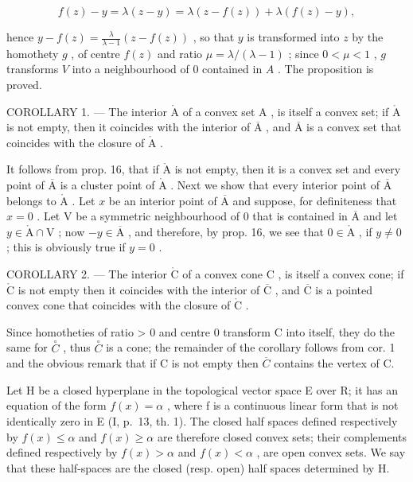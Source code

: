 \[
f (z) - y = \lambda (z - y) = \lambda (z - f (z)) + \lambda (f (z) - y),
\]

hence \(y - f(z) = \frac{\lambda}{\lambda - 1} (z - f(z))\) , so that \(y\) is transformed into \(z\) by the homothety \(g\) , of centre \(f(z)\) and ratio \(\mu = \lambda / (\lambda - 1)\) ; since \(0 < \mu < 1\) , \(g\) transforms \(V\) into a neighbourhood of 0 contained in \(A\) . The proposition is proved.

COROLLARY 1. --- The interior \(\mathring{\mathrm{A}}\) of a convex set \(\mathrm{A}\) , is itself a convex set; if \(\mathring{\mathrm{A}}\) is not empty, then it coincides with the interior of \(\overline{\mathrm{A}}\) , and \(\overline{\mathrm{A}}\) is a convex set that coincides with the closure of \(\mathring{\mathrm{A}}\) .

It follows from prop. 16, that if \(\mathring{\mathrm{A}}\) is not empty, then it is a convex set and every point of \(\overline{\mathrm{A}}\) is a cluster point of \(\mathring{\mathrm{A}}\) . Next we show that every interior point of \(\overline{\mathrm{A}}\) belongs to \(\mathring{\mathrm{A}}\) . Let \(x\) be an interior point of \(\overline{\mathrm{A}}\) and suppose, for definiteness that \(x = 0\) . Let \(\mathrm{V}\) be a symmetric neighbourhood of 0 that is contained in \(\overline{\mathrm{A}}\) and let \(y \in \mathring{\mathrm{A}} \cap \mathrm{V}\) ; now \(-y \in \overline{\mathrm{A}}\) , and therefore, by prop. 16, we see that \(0 \in \mathring{\mathrm{A}}\) , if \(y \neq 0\) ; this is obviously true if \(y = 0\) .

COROLLARY 2. --- The interior \(\mathring{\mathrm{C}}\) of a convex cone \(\mathrm{C}\) , is itself a convex cone; if \(\mathring{\mathrm{C}}\) is not empty then it coincides with the interior of \(\overline{\mathrm{C}}\) , and \(\overline{\mathrm{C}}\) is a pointed convex cone that coincides with the closure of \(\mathring{\mathrm{C}}\) .

Since homotheties of ratio \textgreater{} 0 and centre 0 transform C into itself, they do the same for \(\overset{\circ}{C}\) , thus \(\overset{\circ}{C}\) is a cone; the remainder of the corollary follows from cor. 1 and the obvious remark that if C is not empty then \(\overline{C}\) contains the vertex of C.

Let H be a closed hyperplane in the topological vector space E over R; it has an equation of the form \(f(x) = \alpha\) , where f is a continuous linear form that is not identically zero in E (I, p.~13, th. 1). The closed half spaces defined respectively by \(f(x) \leqslant \alpha\) and \(f(x) \geqslant \alpha\) are therefore closed convex sets; their complements defined respectively by \(f(x) > \alpha\) and \(f(x) < \alpha\) , are open convex sets. We say that these half-spaces are the closed (resp. open) half spaces determined by H.


